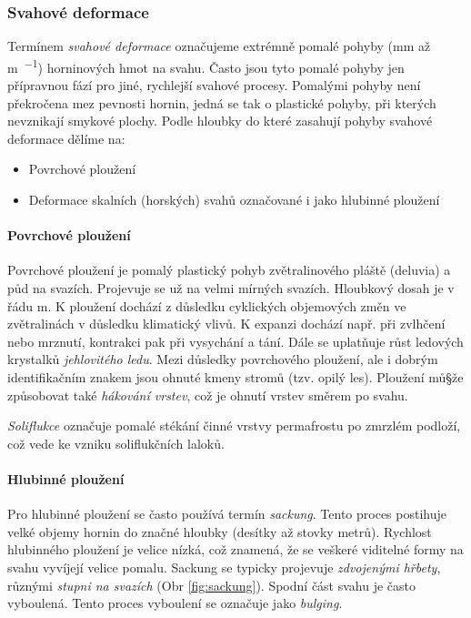 \subsubsection{Svahové deformace}
Termínem \emph{svahové deformace} označujeme extrémně pomalé pohyby (\si{\milli\metre} až \si{\metre\per\rok}) horninových hmot na svahu. Často jsou tyto pomalé pohyby jen přípravnou fází pro jiné, rychlejší svahové procesy. Pomalými pohyby není překročena mez pevnosti hornin, jedná se tak o plastické pohyby, při kterých nevznikají smykové plochy. Podle hloubky do které zasahují pohyby svahové deformace dělíme na:

\begin{itemize}
	\item Povrchové ploužení
	\item Deformace skalních (horských) svahů označované i jako hlubinné ploužení
\end{itemize}

\paragraph{Povrchové ploužení}
Povrchové ploužení je pomalý plastický pohyb zvětralinového pláště (deluvia) a půd na svazích. Projevuje se už na velmi mírných svazích. Hloubkový dosah je v řádu \si{\metre}. K ploužení dochází z důsledku cyklických objemových změn ve zvětralinách v důsledku klimatický vlivů. K expanzi dochází např. při zvlhčení nebo mrznutí, kontrakci pak při vysychání a tání. Dále se uplatňuje růst ledových krystalků \emph{jehlovitého ledu}. Mezi důsledky povrchového ploužení, ale i dobrým identifikačním znakem jsou ohnuté kmeny stromů (tzv. opilý les). Ploužení mů§že způsobovat také  \emph{hákování vrstev}, což je ohnutí vrstev směrem po svahu. 

\emph{Soliflukce} označuje pomalé stékání činné vrstvy permafrostu po zmrzlém podloží, což vede ke vzniku soliflukčních laloků.

\paragraph{Hlubinné ploužení}
Pro hlubinné ploužení se často používá termín \emph{sackung}. Tento proces postihuje velké objemy hornin do značné hloubky (desítky až stovky metrů). Rychlost hlubinného ploužení je velice nízká, což znamená, že se veškeré viditelné formy na svahu vyvíjejí velice pomalu. Sackung se typicky projevuje \emph{zdvojenými hřbety}, různými \emph{stupni na svazích} (Obr \ref{fig:sackung}). Spodní část svahu je často vyboulená. Tento proces vyboulení se označuje jako \emph{bulging}.

